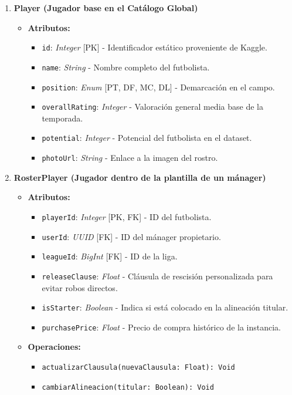 \begin{enumerate}
    \item \textbf{Player (Jugador base en el Catálogo Global)}
    \begin{itemize}
        \item \textbf{Atributos:}
            \begin{itemize}
                \item \texttt{id}: \textit{Integer} [PK] - Identificador estático proveniente de Kaggle.
                \item \texttt{name}: \textit{String} - Nombre completo del futbolista.
                \item \texttt{position}: \textit{Enum} [PT, DF, MC, DL] - Demarcación en el campo.
                \item \texttt{overallRating}: \textit{Integer} - Valoración general media base de la temporada.
                \item \texttt{potential}: \textit{Integer} - Potencial del futbolista en el dataset.
                \item \texttt{photoUrl}: \textit{String} - Enlace a la imagen del rostro.
            \end{itemize}
    \end{itemize}

    \item \textbf{RosterPlayer (Jugador dentro de la plantilla de un mánager)}
    \begin{itemize}
        \item \textbf{Atributos:}
            \begin{itemize}
                \item \texttt{playerId}: \textit{Integer} [PK, FK] - ID del futbolista.
                \item \texttt{userId}: \textit{UUID} [FK] - ID del mánager propietario.
                \item \texttt{leagueId}: \textit{BigInt} [FK] - ID de la liga.
                \item \texttt{releaseClause}: \textit{Float} - Cláusula de rescisión personalizada para evitar robos directos.
                \item \texttt{isStarter}: \textit{Boolean} - Indica si está colocado en la alineación titular.
                \item \texttt{purchasePrice}: \textit{Float} - Precio de compra histórico de la instancia.
            \end{itemize}
        \item \textbf{Operaciones:}
            \begin{itemize}
                \item \texttt{actualizarClausula(nuevaClausula: Float): Void}
                \item \texttt{cambiarAlineacion(titular: Boolean): Void}
            \end{itemize}
    \end{itemize}


\end{enumerate}
